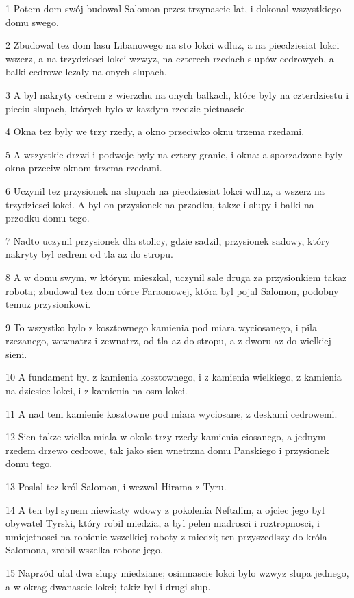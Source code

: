 \par 1 Potem dom swój budowal Salomon przez trzynascie lat, i dokonal wszystkiego domu swego.
\par 2 Zbudowal tez dom lasu Libanowego na sto lokci wdluz, a na piecdziesiat lokci wszerz, a na trzydziesci lokci wzwyz, na czterech rzedach slupów cedrowych, a balki cedrowe lezaly na onych slupach.
\par 3 A byl nakryty cedrem z wierzchu na onych balkach, które byly na czterdziestu i pieciu slupach, których bylo w kazdym rzedzie pietnascie.
\par 4 Okna tez byly we trzy rzedy, a okno przeciwko oknu trzema rzedami.
\par 5 A wszystkie drzwi i podwoje byly na cztery granie, i okna: a sporzadzone byly okna przeciw oknom trzema rzedami.
\par 6 Uczynil tez przysionek na slupach na piecdziesiat lokci wdluz, a wszerz na trzydziesci lokci. A byl on przysionek na przodku, takze i slupy i balki na przodku domu tego.
\par 7 Nadto uczynil przysionek dla stolicy, gdzie sadzil, przysionek sadowy, który nakryty byl cedrem od tla az do stropu.
\par 8 A w domu swym, w którym mieszkal, uczynil sale druga za przysionkiem takaz robota; zbudowal tez dom córce Faraonowej, która byl pojal Salomon, podobny temuz przysionkowi.
\par 9 To wszystko bylo z kosztownego kamienia pod miara wyciosanego, i pila rzezanego, wewnatrz i zewnatrz, od tla az do stropu, a z dworu az do wielkiej sieni.
\par 10 A fundament byl z kamienia kosztownego, i z kamienia wielkiego, z kamienia na dziesiec lokci, i z kamienia na osm lokci.
\par 11 A nad tem kamienie kosztowne pod miara wyciosane, z deskami cedrowemi.
\par 12 Sien takze wielka miala w okolo trzy rzedy kamienia ciosanego, a jednym rzedem drzewo cedrowe, tak jako sien wnetrzna domu Panskiego i przysionek domu tego.
\par 13 Poslal tez król Salomon, i wezwal Hirama z Tyru.
\par 14 A ten byl synem niewiasty wdowy z pokolenia Neftalim, a ojciec jego byl obywatel Tyrski, który robil miedzia, a byl pelen madrosci i roztropnosci, i umiejetnosci na robienie wszelkiej roboty z miedzi; ten przyszedlszy do króla Salomona, zrobil wszelka robote jego.
\par 15 Naprzód ulal dwa slupy miedziane; osimnascie lokci bylo wzwyz slupa jednego, a w okrag dwanascie lokci; takiz byl i drugi slup.
